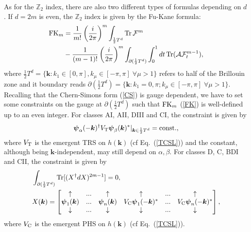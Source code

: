 \documentclass[prl,twocolumn,preprintnumbers,superscriptaddress,amsmath,amssymb]{revtex4-1}
\newcommand{\Tr}{\operatorname{Tr}}
\begin{document}
As for the $\mathbb{Z}_2$ index, there are also two different types of formulas depending on $d$. If $d=2m$ is even, the $\mathbb{Z}_2$ index is given by the Fu-Kane formula: 
\begin{equation}
\begin{split}
{\rm FK}_m &= \frac{1}{m!}\left(\frac{i}{2\pi}\right)^m \int_{\frac{1}{2}T^d} \Tr\mathcal{F}^m  \\
&-  \frac{1}{(m-1)!} \left(\frac{i}{2\pi}\right)^m \int_{\partial (\frac{1}{2}T^d)} \int^1_0 dt \Tr (\mathcal{A}\mathcal{F}^{m-1}_t),
\label{FK}
\end{split}
\end{equation}
where $\frac{1}{2}T^d=\{\boldsymbol{k}: k_1\in[0,\pi], k_\mu\in[-\pi,\pi]\;\forall\mu>1\}$ refers to half of the Brillouin zone and it boundary reads $\partial(\frac{1}{2}T^d)=\{\boldsymbol{k}: k_1=0,\pi; k_\mu\in[-\pi,\pi]\;\forall\mu>1\}$. Recalling that the Chern-Simons form (\ref{CS}) is gauge dependent, we have to set some constraints on the gauge at $\partial(\frac{1}{2}T^d)$ such that ${\rm FK}_m$ (\ref{FK}) is well-defined up to an even integer. For classes AI, AII, DIII and CI, the constraint is given by
\begin{equation}
\boldsymbol{\psi}_\alpha(-\boldsymbol{k})^\dag V_{\rm T}\boldsymbol{\psi}_\beta(\boldsymbol{k})^*|_{\boldsymbol{k}\in \frac{1}{2}T^d} = {\rm const.},
\label{TRSc}
\end{equation}
where $V_{\rm T}$ is the emergent TRS on $h(\boldsymbol{k})$ (cf Eq.~(\ref{TCSL})) and the constant, although being $\boldsymbol{k}$-independent, may still depend on $\alpha,\beta$. For classes D, C, BDI and CII, the constraint is given by
\begin{equation}
\begin{split}
&\int_{\partial(\frac{1}{2}T^d)} \Tr[ ( X^\dag d X)^{2m-1}]=0,\\
&X(\boldsymbol{k})=
\begin{bmatrix}
\uparrow & ... & \uparrow  & \uparrow & ... & \uparrow  \\
\boldsymbol{\psi}_1(\boldsymbol{k}) & ... & \boldsymbol{\psi}_n(\boldsymbol{k}) & V_{\rm C}\boldsymbol{\psi}_1(-\boldsymbol{k})^* & ... &  V_{\rm C}\boldsymbol{\psi}_n(-\boldsymbol{k})^* \\
\downarrow & ... & \downarrow & \downarrow & ... & \downarrow  \\
\end{bmatrix},
\label{PHSc}
\end{split}
\end{equation}
where $V_{\rm C}$ is the emergent PHS on $h(\boldsymbol{k})$ (cf Eq.~(\ref{TCSL})).
\end{document}
